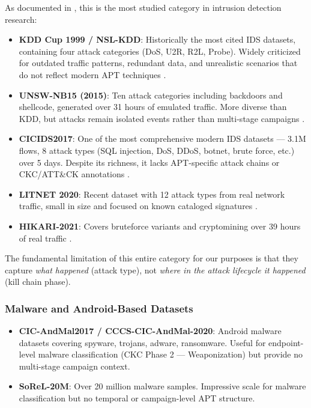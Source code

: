 As documented in \cite{ankalaki2025cyber}, this is the most studied category in intrusion detection research:

\begin{itemize}
    \item \textbf{KDD Cup 1999 / NSL-KDD}: Historically the most cited IDS datasets, containing four attack categories (DoS, U2R, R2L, Probe). Widely criticized for outdated traffic patterns, redundant data, and unrealistic scenarios that do not reflect modern APT techniques \cite{ankalaki2025cyber}.
    \item \textbf{UNSW-NB15 (2015)}: Ten attack categories including backdoors and shellcode, generated over 31 hours of emulated traffic. More diverse than KDD, but attacks remain isolated events rather than multi-stage campaigns \cite{ankalaki2025cyber}.
    \item \textbf{CICIDS2017}: One of the most comprehensive modern IDS datasets --- 3.1M flows, 8 attack types (SQL injection, DoS, DDoS, botnet, brute force, etc.) over 5 days. Despite its richness, it lacks APT-specific attack chains or CKC/ATT\&CK annotations \cite{ankalaki2025cyber}.
    \item \textbf{LITNET 2020}: Recent dataset with 12 attack types from real network traffic, small in size and focused on known cataloged signatures \cite{ankalaki2025cyber}.
    \item \textbf{HIKARI-2021}: Covers bruteforce variants and cryptomining over 39 hours of real traffic \cite{ankalaki2025cyber}.
\end{itemize}

The fundamental limitation of this entire category for our purposes is that they capture \textit{what happened} (attack type), not \textit{where in the attack lifecycle it happened} (kill chain phase).

\subsubsection{Malware and Android-Based Datasets}

\begin{itemize}
    \item \textbf{CIC-AndMal2017 / CCCS-CIC-AndMal-2020}: Android malware datasets covering spyware, trojans, adware, ransomware. Useful for endpoint-level malware classification (CKC Phase 2 --- Weaponization) but provide no multi-stage campaign context.
    \item \textbf{SoReL-20M}: Over 20 million malware samples. Impressive scale for malware classification but no temporal or campaign-level APT structure.
\end{itemize}

